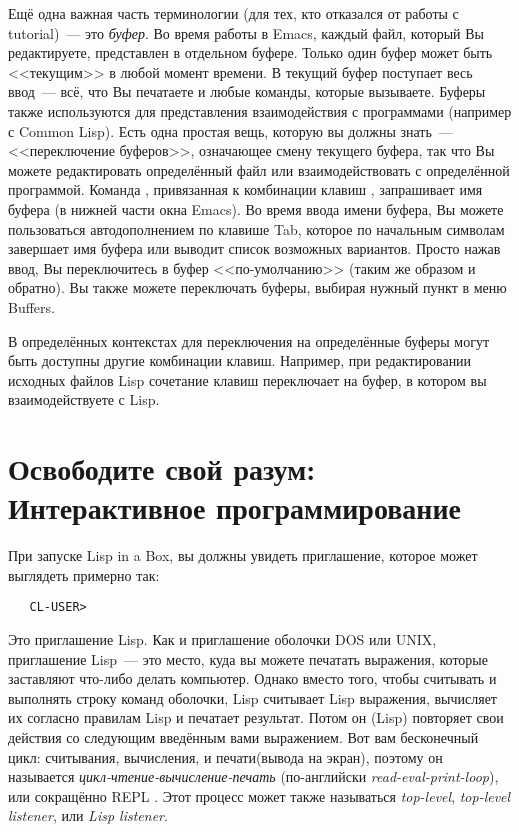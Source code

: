 Ещё одна важная часть терминологии (для тех, кто отказался от работы с tutorial)~--- это
\emph{буфер}. Во время работы в Emacs, каждый файл, который Вы редактируете, представлен в
отдельном буфере. Только один буфер может быть <<текущим>> в любой момент времени. В текущий
буфер поступает весь ввод~--- всё, что Вы печатаете и любые команды, которые
вызываете. Буферы также используются для представления взаимодействия с программами
(например с Common Lisp). Есть одна простая вещь, которую вы должны знать~--- <<переключение
буферов>>, означающее смену текущего буфера, так что Вы можете редактировать определённый
файл или взаимодействовать с определённой программой. Команда ,
привязанная к комбинации клавиш , запрашивает имя буфера (в нижней части окна
Emacs). Во время ввода имени буфера, Вы можете пользоваться автодополнением по клавише
Tab, которое по начальным символам завершает имя буфера или выводит список возможных
вариантов. Просто нажав ввод, Вы переключитесь в буфер <<по-умолчанию>> (таким же образом и
обратно). Вы также можете переключать буферы, выбирая нужный пункт в меню Buffers.

В определённых контекстах для переключения на определённые буферы могут быть доступны
другие комбинации клавиш. Например, при редактировании исходных файлов Lisp сочетание
клавиш  переключает на буфер, в котором вы взаимодействуете с Lisp.

\section{Освободите свой разум: Интерактивное программирование}

При запуске Lisp in a Box, вы должны увидеть приглашение, которое может выглядеть примерно
так:

\begin{verbatim}
   CL-USER>
\end{verbatim}

Это приглашение Lisp. Как и приглашение оболочки DOS или UNIX, приглашение Lisp~--- это
место, куда вы можете печатать выражения, которые заставляют что-либо делать
компьютер. Однако вместо того, чтобы считывать и выполнять строку команд оболочки, Lisp
считывает Lisp выражения, вычисляет их согласно правилам Lisp и печатает результат. Потом
он (Lisp) повторяет свои действия со следующим введённым вами выражением. Вот вам
бесконечный цикл: считывания, вычисления, и печати(вывода на экран), поэтому он называется
\textit{цикл-чтение-вычисление-печать} (по-английски \textit{read-eval-print-loop}), или
сокращённо REPL . Этот процесс может также называться \textit{top-level},
\textit{top-level listener}, или \textit{Lisp listener}.

